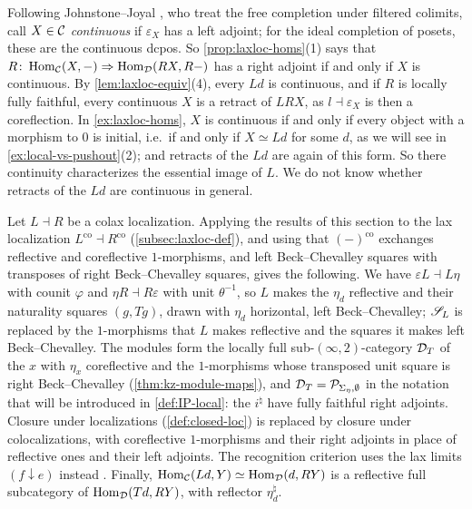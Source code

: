 \begin{rmk}
\label{rmk:laxloc-continuous}
%
Following Johnstone--Joyal \cite{johnstonejoyal1982continuous}, who treat the
free completion under filtered colimits, call $X \in \mathcal{C}$ \emph{continuous} if
$\varepsilon_{X}$ has a left adjoint; for the ideal completion of posets, these
are the continuous dcpos. So \cref{prop:laxloc-homs}(1) says that
$R\colon \operatorname{Hom}_{\mathcal{C}}(X,-) \Rightarrow \operatorname{Hom}_{\mathcal{D}}(RX,R-)$
has a right adjoint if and only if $X$ is continuous. By
\cref{lem:laxloc-equiv}(4), every $Ld$ is continuous, and if $R$ is locally
fully faithful, every continuous $X$ is a retract of $LRX$, as
$l \dashv \varepsilon_{X}$
is then a coreflection. In \cref{ex:laxloc-homs}, $X$ is continuous if and only
if every object with a morphism to $0$ is initial, i.e.\ if and only if
$X \simeq Ld$
for some $d$, as we will see in \cref{ex:local-vs-pushout}(2); and retracts of
the $Ld$ are again of this form. So there continuity characterizes the
essential image of $L$. We do not know whether retracts of the $Ld$ are
continuous in general.
\end{rmk}

\begin{rmk}
\label{rmk:laxloc-colax}
%
Let $L \dashv R$ be a colax localization. Applying the results of this section
to the lax localization
$L^{\mathrm{co}} \dashv R^{\mathrm{co}}$
(\cref{subsec:laxloc-def}), and using that $(-)^{\mathrm{co}}$ exchanges
reflective and coreflective $1$-morphisms, and left Beck--Chevalley squares
with transposes of right Beck--Chevalley squares, gives the following.
We have
$\varepsilon L \dashv L\eta$
with counit $\varphi$ and
$\eta R \dashv R\varepsilon$
with unit $\theta^{-1}$, so $L$ makes the $\eta_{d}$ reflective and their
naturality squares $(g,Tg)$, drawn with $\eta_{d}$ horizontal, left
Beck--Chevalley; $\mathscr{S}_{L}$ is replaced by the $1$-morphisms that $L$ makes
reflective and the squares it makes left Beck--Chevalley. The modules form the
locally full sub-$(\infty,2)$-category $\mathcal{D}_{T}$ of the $x$ with $\eta_{x}$
coreflective and the $1$-morphisms whose transposed unit square is right
Beck--Chevalley (\cref{thm:kz-module-maps}), and
$\mathcal{D}_{T} = \mathcal{P}_{\Sigma_{\eta},\emptyset}$
in the notation that will be introduced in \cref{def:IP-local}:
the $i^{\natural}$
have fully faithful right adjoints. Closure under localizations
(\cref{def:closed-loc}) is
replaced by closure under colocalizations, with coreflective $1$-morphisms and
their right adjoints in place of reflective ones and their left adjoints.
The recognition criterion uses the lax limits
$(f \downarrow e)$
instead \cite[Rem.~3.3]{bourke2025recognition}. Finally,
$\operatorname{Hom}_{\mathcal{C}}(Ld,Y) \simeq \operatorname{Hom}_{\mathcal{D}}(d,RY)$
is a reflective full subcategory of
$\operatorname{Hom}_{\mathcal{D}}(Td,RY)$,
with reflector $\eta_{d}^{\natural}$.
\end{rmk}
